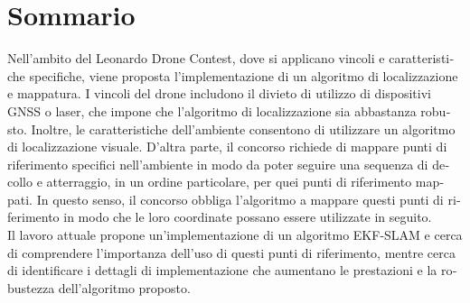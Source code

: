 \chapter*{Sommario}
\begin{otherlanguage}{italian}

Nell'ambito del Leonardo Drone Contest, dove si applicano vincoli e caratteristiche specifiche, viene proposta l'implementazione di un algoritmo di localizzazione e mappatura. I vincoli del drone includono il divieto di utilizzo di dispositivi GNSS o laser, che impone che l'algoritmo di localizzazione sia abbastanza robusto. Inoltre, le caratteristiche dell'ambiente consentono di utilizzare un algoritmo di localizzazione visuale. D'altra parte, il concorso richiede di mappare punti di riferimento specifici nell'ambiente in modo da poter seguire una sequenza di decollo e atterraggio, in un ordine particolare, per quei punti di riferimento mappati. In questo senso, il concorso obbliga l'algoritmo a mappare questi punti di riferimento in modo che le loro coordinate possano essere utilizzate in seguito. \\

Il lavoro attuale propone un'implementazione di un algoritmo EKF-SLAM e cerca di comprendere l'importanza dell'uso di questi punti di riferimento, mentre cerca di identificare i dettagli di implementazione che aumentano le prestazioni e la robustezza dell'algoritmo proposto.

\end{otherlanguage}
\endgroup